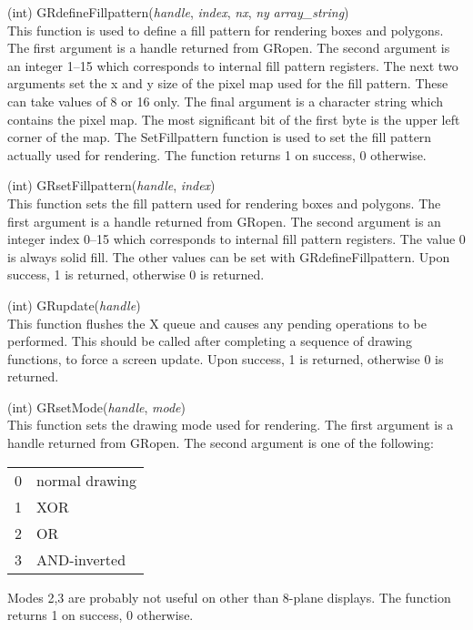 \begin{description}
\item{(int) \vt GRdefineFillpattern({\it handle}, {\it index},
  {\it nx}, {\it ny} {\it array\_string\/})}\\
This function is used to define a fill pattern for rendering boxes and
polygons.  The first argument is a handle returned from {\vt GRopen}. 
The second argument is an integer 1--15 which corresponds to internal
fill pattern registers.  The next two arguments set the x and y size
of the pixel map used for the fill pattern.  These can take values of
8 or 16 only.  The final argument is a character string which contains
the pixel map.  The most significant bit of the first byte is the
upper left corner of the map.  The {\vt SetFillpattern} function is
used to set the fill pattern actually used for rendering.  The
function returns 1 on success, 0 otherwise.

\item{(int) \vt GRsetFillpattern({\it handle}, {\it index\/})}\\
This function sets the fill pattern used for rendering boxes and
polygons.  The first argument is a handle returned from {\vt GRopen}. 
The second argument is an integer index 0--15 which corresponds to
internal fill pattern registers.  The value 0 is always solid fill. 
The other values can be set with {\vt GRdefineFillpattern}.  Upon
success, 1 is returned, otherwise 0 is returned.

\item{(int) \vt GRupdate({\it handle\/})}\\
This function flushes the X queue and causes any pending operations to
be performed.  This should be called after completing a sequence of
drawing functions, to force a screen update.  Upon success, 1 is
returned, otherwise 0 is returned.

\item{(int) \vt GRsetMode({\it handle}, {\it mode\/})}\\
This function sets the drawing mode used for rendering.  The first
argument is a handle returned from {\vt GRopen}.  The second argument
is one of the following:

\begin{tabular}{ll}
0 & normal drawing\\
1 & XOR\\
2 & OR\\
3 & AND-inverted\\
\end{tabular}

Modes 2,3 are probably not useful on other than 8-plane displays. 
The function returns 1 on success, 0 otherwise.

\end{description}


